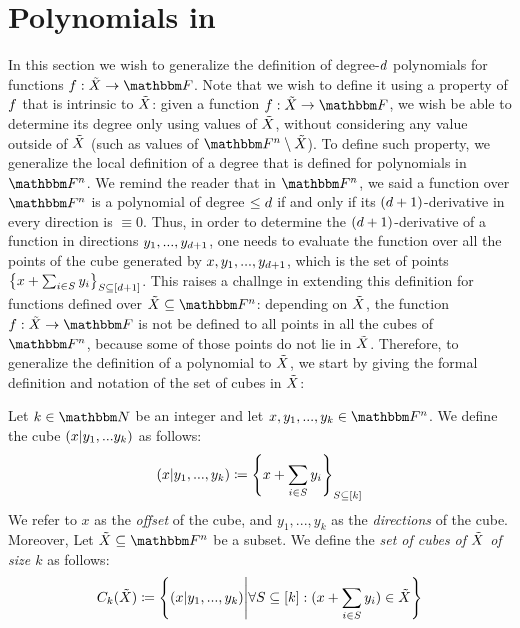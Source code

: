 \section[Polynomials in \titlevariety]{Polynomials in \titlevariety}\label{sec:polynomials_in_X}
In this section we wish to generalize the definition of degree-$d$ polynomials for functions $\funcdef{\onvarfunc}{\variety}{\basefield}$.
Note that we wish to define it using a property of $\onvarfunc$ that is intrinsic to ${\tilde{X}}$: given a function $\funcdef{\onvarfunc}{\variety}{\basefield}$,
we wish be able to determine its degree only using values of ${\tilde{X}}$, without considering any value outside of ${\tilde{X}}$ (such as values of $\field \setminus \variety$).
\newline
To define such property, we generalize the local definition of a degree that is defined for polynomials in $\field$.
We remind the reader that in $\field$, we said a function over $\field$ is a polynomial of degree $\leq d$ if and only if its $(d+1)$-derivative in every direction is $\equiv 0$.
Thus, in order to determine the $(d+1)$-derivative of a function in directions $y_1,...,y_{d+1}$, one needs to evaluate the function over all the points of the cube generated by $x,y_1,...,y_{d+1}$,
which is the set of points $\left\{ x + \sum_{i \in S}{y_i} \right\}_{S \subseteq [d+1]}$.
This raises a challnge in extending this definition for functions defined over $\variety \subseteq \field$:
depending on ${\tilde{X}}$, the function $\funcdef{\onvarfunc}{\variety}{\basefield}$ is not be defined to all points in all the cubes of $\field$, because some of those points do not lie in ${\tilde{X}}$.
\newline
Therefore, to generalize the definition of a polynomial to ${\tilde{X}}$, we start by giving the formal definition and notation of the set of cubes in ${\tilde{X}}$:
\begin{definition}[Cubes]
    Let $k \in \naturalnumbersset$ be an integer and let $x, y_1,...,y_{k} \in \field$.
    We define the cube $(x|y_1,...y_{k})$ as follows:
    \[
        (x|y_1,...,y_{k}) \coloneqq \left\{ x + \sum_{i \in S}{y_i} \right\}_{S \subseteq [k]}
    \]
    We refer to $x$ as the \emph{offset} of the cube, and $y_1,...,y_{k}$ as the \emph{directions} of the cube.
    \newline
    Moreover, Let $\variety \subseteq \field$ be a subset.
    We define the \emph{set of cubes of ${\tilde{X}}$ of size $k$} as follows:
    \[
        C_{k}({\tilde{X}}) \coloneqq
            \left\{ (x|y_1,...,y_{k}) \middle| \forall S \subseteq[k]: (x + \sum_{i \in S}{y_i}) \in {\tilde{X}} \right\}
    \]
\end{definition}

